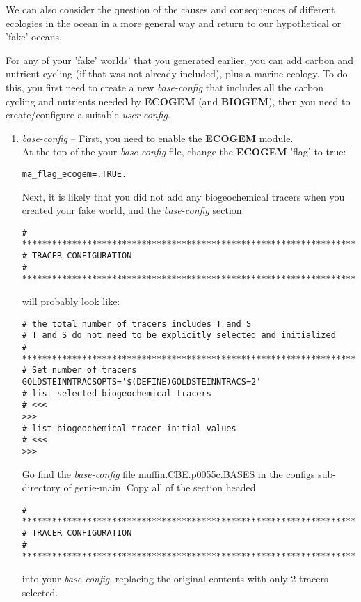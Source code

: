 \documentclass[11pt,fleqn]{book} %
\begin{document}
%
We can also consider the question of the causes and consequences of different ecologies in the ocean in a more general way and return to our hypothetical or 'fake' oceans.

For any of your 'fake' worlds' that you generated earlier, you can add carbon and nutrient cycling (if that was not already included), plus a marine ecology. To do this, you first need to create a new \textit{base-config} that includes all the carbon cycling and nutrients needed by \textbf{ECOGEM} (and \textbf{BIOGEM}), then you need to create/configure a suitable \textit{user-config}.

\begin{enumerate}[noitemsep]

\vspace{1mm}
\item \textit{base-config} -- First, you need to enable the \textbf{ECOGEM} module.
\\At the top of the your \textit{base-config} file, change the \textbf{ECOGEM} 'flag' to true:
\vspace{-1mm}\begin{verbatim}
ma_flag_ecogem=.TRUE.
\end{verbatim}\vspace{-1mm}
Next, it is likely that you did not add any biogeochemical tracers when you created your fake world, and the \textit{base-config} section:
\footnotesize\begin{verbatim}
# *******************************************************************
# TRACER CONFIGURATION
# *******************************************************************
\end{verbatim}\normalsize
will probably look like:
\footnotesize\begin{verbatim}
# the total number of tracers includes T and S
# T and S do not need to be explicitly selected and initialized
# *******************************************************************
# Set number of tracers
GOLDSTEINNTRACSOPTS='$(DEFINE)GOLDSTEINNTRACS=2'
# list selected biogeochemical tracers
# <<<                                                             >>>
# list biogeochemical tracer initial values
# <<<                                                             >>>
\end{verbatim}\normalsize
Go find the \textit{base-config} file \textsf{\footnotesize muffin.CBE.p0055c.BASES} in the \textsf{\footnotesize configs} sub-directory of \textsf{\footnotesize genie-main}. Copy all of the section headed
\footnotesize\begin{verbatim}
# *******************************************************************
# TRACER CONFIGURATION
# *******************************************************************
\end{verbatim}\normalsize
into your \textit{base-config}, replacing the original contents with only 2 tracers selected.


\end{enumerate}
\end{document}
